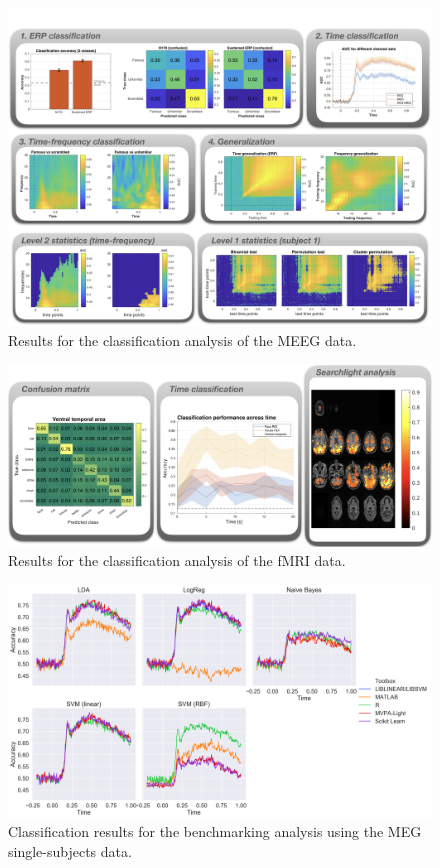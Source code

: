 \documentclass[utf8]{frontiersSCNS} %
\begin{document}
\begin{figure}[ht!]
\centering\includegraphics[width=\linewidth]{MVPA_results}
\caption{Results for the classification analysis of the \cite{Wakeman2015ADataset} MEEG data.}\label{fig:results}
\end{figure}


\begin{figure}[ht!]
\centering\includegraphics[width=\linewidth]{fmri_results}
\caption{Results for the classification analysis of the \cite{Haxby2001} fMRI data.}\label{fig:fmri_results}
\end{figure}

\begin{figure}[ht!]
\centering\includegraphics[width=\linewidth]{benchmark_classification}
\caption{Classification results for the benchmarking analysis using the MEG single-subjects data.}\label{fig:benchmarking}
\end{figure}
\end{document}
